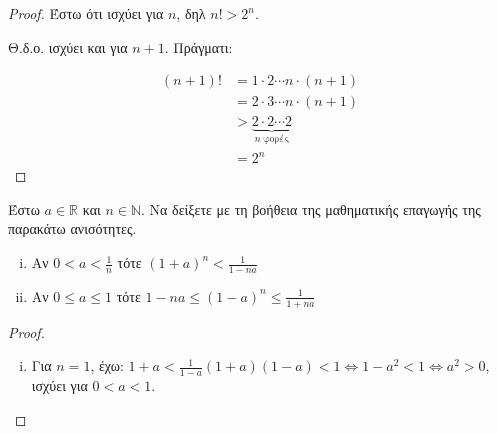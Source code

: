 \begin{multicols}{2}
\begin{enumerate}
\begin{proof}
            Έστω ότι ισχύει για $n$, δηλ $ n! >2^{n} $. 

            Θ.δ.ο. ισχύει και για $ n+1 $. Πράγματι:

            \begin{align*} (n+1)! &= 1 \cdot 2 \cdots n \cdot (n+1) \\
                &= 2 \cdot 3 \cdots n \cdot (n+1) \\ 
                & > \underbrace{2 \cdot 2 \cdots 2}_{n \; \text{φορές}} \\
                &= 2^{n} 
            \end{align*}
        \end{proof}


    \item Έστω $ a \in \mathbb{R} $ και $ n \in \mathbb{N} $. Να δείξετε
        με τη βοήθεια της μαθηματικής επαγωγής της παρακάτω ανισότητες.

        \begin{enumerate}[i)]
            \item Αν $ 0<a< \frac{1}{n} $ τότε $ (1+a)^{n} < \frac{1}{1-na} $
            \item Αν $ 0 \leq a \leq 1$  τότε $ 1-na \leq (1-a)^{n} \leq
                \frac{1}{1+na} $
        \end{enumerate}

        \begin{proof}
        \item {}
            \begin{enumerate}[i)]
                \item Για $ n=1 $, έχω: $ 1+a < \frac{1}{1-a} (1+a)(1-a) < 1 
                    \Leftrightarrow 1-a^{2} <1 \Leftrightarrow a^{2} > 0  $, ισχύει 
                    για $ 0<a<1 $.
            \end{enumerate}
        \end{proof}
    \end{enumerate}
    

\end{multicols}


